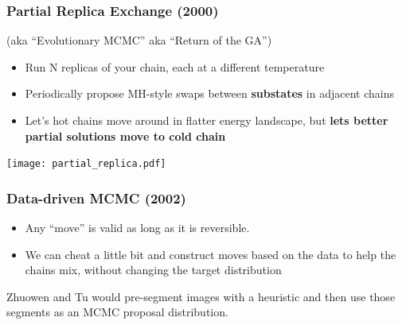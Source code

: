 \documentclass[compress]{beamer}
\begin{document}
\begin{frame}
  \frametitle{Partial Replica Exchange (2000)}
  (aka ``Evolutionary MCMC'' \cite{Liang_Evolutionary_2000} aka ``Return of the GA'')
  \begin{itemize}
  \item Run N replicas of your chain, each at a different temperature
  \item Periodically propose MH-style swaps between \textbf{substates} in adjacent chains
  \item Let's hot chains move around in flatter energy landscape, but \textbf{lets better partial solutions move to cold chain}
  \end{itemize}
  \texttt{[image: partial\_replica.pdf]}
  
\end{frame}

\begin{frame}
  \frametitle{Data-driven MCMC (2002)}
  \begin{itemize}
    \item Any ``move'' is valid as long as it is reversible.  
    \item We can cheat a little bit and construct moves based on the data to help the chains mix, 
      without changing the target distribution
  \end{itemize}
  
  Zhuowen and Tu \cite{zhuowen_tu_image_2002} would pre-segment images
  with a heuristic and then use those segments as an MCMC proposal
  distribution.

\end{frame}
\end{document}
